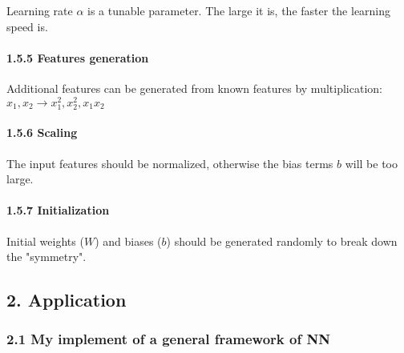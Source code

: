 \documentclass[11pt]{article}
\begin{document}
Learning rate \(\alpha\) is a tunable parameter. The large it is, the
faster the learning speed is.

\paragraph{1.5.5 Features generation}\label{features-generation}

Additional features can be generated from known features by
multiplication: \(x_1, x_2 \to x_1^2, x_2^2, x_1 x_2\)

\paragraph{1.5.6 Scaling}\label{scaling}

The input features should be normalized, otherwise the bias terms \(b\)
will be too large.

\paragraph{1.5.7 Initialization}\label{initialization}

Initial weights (\(W\)) and biases (\(b\)) should be generated randomly
to break down the "symmetry".

    \subsection{2. Application}\label{application}

\subsubsection{2.1 My implement of a general framework of
NN}\label{my-implement-of-a-general-framework-of-nn}
\end{document}
